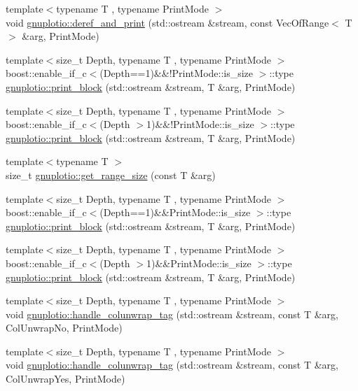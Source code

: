 \begin{DoxyCompactItemize}
{\footnotesize template$<$typename T , typename Print\+Mode $>$ }\\void \hyperlink{namespacegnuplotio_ae768911c8adb77bfc080d5e4561573e6}{gnuplotio\+::deref\+\_\+and\+\_\+print} (std\+::ostream \&stream, const Vec\+Of\+Range$<$ T $>$ \&arg, Print\+Mode)
\item 
{\footnotesize template$<$size\+\_\+t Depth, typename T , typename Print\+Mode $>$ }\\boost\+::enable\+\_\+if\+\_\+c$<$(Depth==1)\&\&!Print\+Mode\+::is\+\_\+size $>$\+::type \hyperlink{namespacegnuplotio_a631368ab4e255d2a5d563a41895f2edc}{gnuplotio\+::print\+\_\+block} (std\+::ostream \&stream, T \&arg, Print\+Mode)
\item 
{\footnotesize template$<$size\+\_\+t Depth, typename T , typename Print\+Mode $>$ }\\boost\+::enable\+\_\+if\+\_\+c$<$(Depth $>$1)\&\&!Print\+Mode\+::is\+\_\+size $>$\+::type \hyperlink{namespacegnuplotio_a753a3551f418723c022be60c12379025}{gnuplotio\+::print\+\_\+block} (std\+::ostream \&stream, T \&arg, Print\+Mode)
\item 
{\footnotesize template$<$typename T $>$ }\\size\+\_\+t \hyperlink{namespacegnuplotio_abb416b68686102ba84a2cb53c96b64e9}{gnuplotio\+::get\+\_\+range\+\_\+size} (const T \&arg)
\item 
{\footnotesize template$<$size\+\_\+t Depth, typename T , typename Print\+Mode $>$ }\\boost\+::enable\+\_\+if\+\_\+c$<$(Depth==1)\&\&Print\+Mode\+::is\+\_\+size $>$\+::type \hyperlink{namespacegnuplotio_ae470a0908ac5f51527ff76ecbc1616d1}{gnuplotio\+::print\+\_\+block} (std\+::ostream \&stream, T \&arg, Print\+Mode)
\item 
{\footnotesize template$<$size\+\_\+t Depth, typename T , typename Print\+Mode $>$ }\\boost\+::enable\+\_\+if\+\_\+c$<$(Depth $>$1)\&\&Print\+Mode\+::is\+\_\+size $>$\+::type \hyperlink{namespacegnuplotio_a94e97ca55dc1e5142dcc4457a5e1dd2d}{gnuplotio\+::print\+\_\+block} (std\+::ostream \&stream, T \&arg, Print\+Mode)
\item 
{\footnotesize template$<$size\+\_\+t Depth, typename T , typename Print\+Mode $>$ }\\void \hyperlink{namespacegnuplotio_aef147f3d42f3f2c89cc4c895b8494150}{gnuplotio\+::handle\+\_\+colunwrap\+\_\+tag} (std\+::ostream \&stream, const T \&arg, Col\+Unwrap\+No, Print\+Mode)
\item 
{\footnotesize template$<$size\+\_\+t Depth, typename T , typename Print\+Mode $>$ }\\void \hyperlink{namespacegnuplotio_a3b8981d3f39de8a058b5f18484f06c3c}{gnuplotio\+::handle\+\_\+colunwrap\+\_\+tag} (std\+::ostream \&stream, const T \&arg, Col\+Unwrap\+Yes, Print\+Mode)

\end{DoxyCompactItemize}
